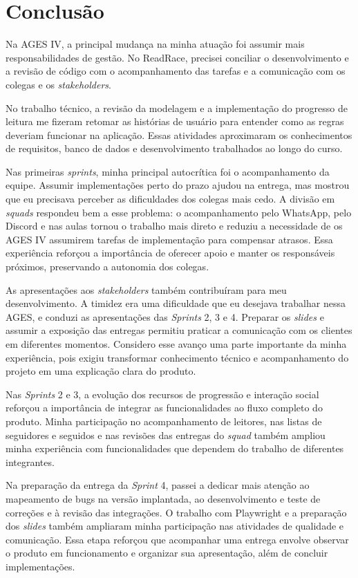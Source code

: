 \section{Conclusão}

Na \ac{AGES} IV, a principal mudança na minha atuação foi assumir mais responsabilidades de gestão. No ReadRace, precisei conciliar o desenvolvimento e a revisão de código com o acompanhamento das tarefas e a comunicação com os colegas e os \textit{stakeholders}.

No trabalho técnico, a revisão da modelagem e a implementação do progresso de leitura me fizeram retomar as histórias de usuário para entender como as regras deveriam funcionar na aplicação. Essas atividades aproximaram os conhecimentos de requisitos, banco de dados e desenvolvimento trabalhados ao longo do curso.

Nas primeiras \textit{sprints}, minha principal autocrítica foi o acompanhamento da equipe. Assumir implementações perto do prazo ajudou na entrega, mas mostrou que eu precisava perceber as dificuldades dos colegas mais cedo. A divisão em \textit{squads} respondeu bem a esse problema: o acompanhamento pelo WhatsApp, pelo Discord e nas aulas tornou o trabalho mais direto e reduziu a necessidade de os \ac{AGES} IV assumirem tarefas de implementação para compensar atrasos. Essa experiência reforçou a importância de oferecer apoio e manter os responsáveis próximos, preservando a autonomia dos colegas.

As apresentações aos \textit{stakeholders} também contribuíram para meu desenvolvimento. A timidez era uma dificuldade que eu desejava trabalhar nessa \ac{AGES}, e conduzi as apresentações das \textit{Sprints} 2, 3 e 4. Preparar os \textit{slides} e assumir a exposição das entregas permitiu praticar a comunicação com os clientes em diferentes momentos. Considero esse avanço uma parte importante da minha experiência, pois exigiu transformar conhecimento técnico e acompanhamento do projeto em uma explicação clara do produto.

Nas \textit{Sprints} 2 e 3, a evolução dos recursos de progressão e interação social reforçou a importância de integrar as funcionalidades ao fluxo completo do produto. Minha participação no acompanhamento de leitores, nas listas de seguidores e seguidos e nas revisões das entregas do \textit{squad} também ampliou minha experiência com funcionalidades que dependem do trabalho de diferentes integrantes.

Na preparação da entrega da \textit{Sprint} 4, passei a dedicar mais atenção ao mapeamento de bugs na versão implantada, ao desenvolvimento e teste de correções e à revisão das integrações. O trabalho com Playwright e a preparação dos \textit{slides} também ampliaram minha participação nas atividades de qualidade e comunicação. Essa etapa reforçou que acompanhar uma entrega envolve observar o produto em funcionamento e organizar sua apresentação, além de concluir implementações.

